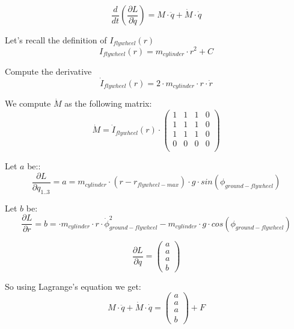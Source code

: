 \begin{equation}
	\frac{d}{dt}(\frac{\partial L}{\partial \dot{q}}) =
	M \cdot \ddot{q} + \dot{M} \cdot \dot{q}
\end{equation}

Let's recall the definition of $I_{flywheel}(r)$
\begin{equation}
	I_{flywheel}(r)= m_{cylinder} \cdot r^2 + C
\end{equation}


Compute the derivative
\begin{equation}
	\dot{I}_{flywheel}(r)= 2 \cdot m_{cylinder} \cdot r \cdot \dot{r}
\end{equation}

We compute $\dot{M}$ as the following matrix:
\begin{equation}
	\dot{M}=
	\dot{I}_{flywheel}(r) \cdot
	\begin{pmatrix}
		1 &
		1 &
		1 &
		0   \\
		1 &
		1 &
		1 &
		0   \\
		1 &
		1 &
		1 &
		0   \\
		0 &
		0 &
		0 &
		0   \\
	\end{pmatrix}
\end{equation}

Let $a$ be::
\begin{equation}
	\frac{\partial L}{\partial q_{1..3}} = a = m_{cylinder}\cdot (r-r_{flywheel-max}) \cdot g \cdot sin(\phi_{ground-flywheel})
\end{equation}

Let $b$ be:
\begin{equation}
	\frac{\partial L}{\partial r} = b = \cdot m_{cylinder} \cdot r  \cdot \dot{\phi}_{ground-flywheel}^2  - m_{cylinder}\cdot g \cdot cos(\phi_{ground-flywheel})
\end{equation}

\begin{equation}
	\frac{\partial L}{\partial q} = \begin{pmatrix}
		a \\ a \\ a \\ b
	\end{pmatrix}
\end{equation}

So using Lagrange's equation we get:
\begin{equation}
	\boxed{
		M \cdot \ddot{q} + \dot{M} \cdot \dot{q}=
		\begin{pmatrix}
			a \\ a \\ a \\ b
		\end{pmatrix}
		+ F
	}
\end{equation}
